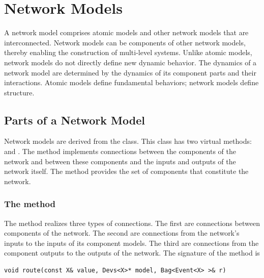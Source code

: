 \chapter{Network Models}
\label{chapter:network_models}
A network model comprises atomic models and other network models that are interconnected. Network models can be components of other network models, thereby enabling the construction of multi-level systems. Unlike atomic models, network models do not directly define new dynamic behavior. The dynamics of a network model are determined by the dynamics of its component parts and their interactions. Atomic models define fundamental behaviors; network models define structure. 

\section{Parts of a Network Model}
\label{section:parts_of_a_network_model}
Network models are derived from the  class. This class has two virtual methods:  and . The  method implements connections between the components of the network and between these components and the inputs and outputs of the network itself. The  method provides the set of components that constitute the network.

\subsection{The  method}
The  method realizes three types of connections. The first are connections between components of the network. The second are connections from the network's inputs to the inputs of its component models. The third are connections from the component outputs to the outputs of the network. The signature of the  method is
\begin{verbatim}
void route(const X& value, Devs<X>* model, Bag<Event<X> >& r) 
\end{verbatim}

